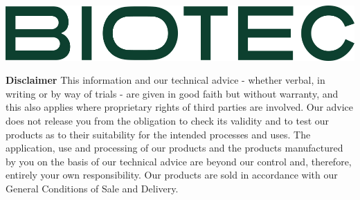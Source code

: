 \documentclass{article}
\begin{document}
\includegraphics[scale=0.30]{biotec}

\small{
	\textbf{Disclaimer} This information and our technical advice - whether verbal, in writing or by way of trials - are given in good faith but without warranty, and this also applies
	where proprietary rights of third parties are involved. Our advice does not release you from the obligation to check its validity and to test our products as to their
	suitability for the intended processes and uses. The application, use and processing of our products and the products manufactured by you on the basis of our technical
	advice are beyond our control and, therefore, entirely your own responsibility. Our products are sold in accordance with our General Conditions of Sale and Delivery.
}
\newpage
\end{document}
